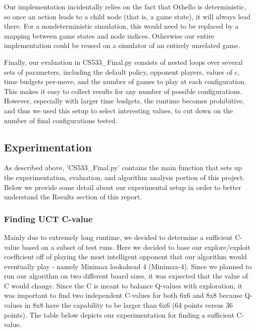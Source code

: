 \documentclass[12pt,letterpaper]{article}
\begin{document}
Our implementation incidentally relies on the fact that Othello is deterministic, so once an action leads to a child node (that is, a game state), it will always lead there. For a nondeterministic simulation, this would need to be replaced by a mapping between game states and node indices. Otherwise our entire implementation could be reused on a simulator of an entirely unrelated game.

Finally, our evaluation in CS533\_Final.py consists of nested loops over several sets of parameters, including the default policy, opponent players, values of c, time budgets per-move, and the number of games to play at each configuration. This makes it easy to collect results for any number of possible configurations. However, especially with larger time budgets, the runtime becomes prohibitive, and thus we used this setup to select interesting values, to cut down on the number of final configurations tested.

\subsection{Experimentation}
As described above, 'CS533\_Final.py' contains the main function that sets up the experimentation, evaluation, and algorithm analysis portion of this project. Below we provide some detail about our experimental setup in order to better understand the Results section of this report.

\subsubsection{Finding UCT C-value} 
Mainly due to extremely long runtime, we decided to determine a sufficient C-value based on a subset of test runs. Here we decided to base our explore/exploit coefficient off of playing the most intelligent opponent that our algorithm would eventually play - namely Minimax lookahead 4 (Minimax-4). Since we planned to run our algorithm on two different board sizes, it was expected that the value of C would change. Since the C is meant to balance Q-values with exploration, it was important to find two independent C-values for both 6x6 and 8x8 because Q-values in 8x8 have the capability to be larger than 6x6 (64 points versus 36 points).  The table below depicts our experimentation for finding a sufficient C-value.
\end{document}
